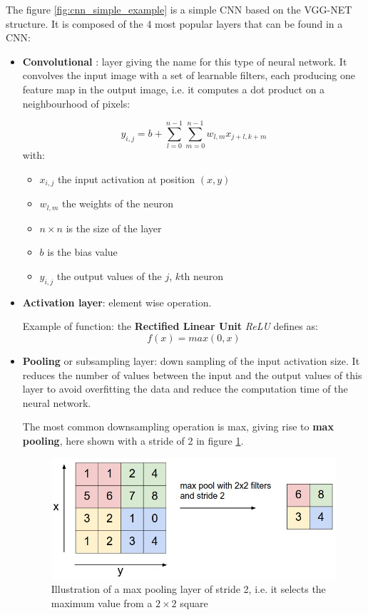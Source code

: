 The figure \ref{fig:cnn_simple_example} is a simple CNN based on the VGG-NET structure. It is composed of the 4 most popular layers that can be found in a CNN:
\begin{itemize}
    \item \textbf{Convolutional} : layer giving the name for this type of neural network. It convolves the input image with a set of learnable filters, each producing one feature map in the output image, i.e. it computes a dot product on a neighbourhood of pixels:
    
    $$ y_{i, j} = b + \sum_{l=0}^{n - 1} \sum_{m=0}^{n - 1}  w_{l,m} x_{j+l, k+m} $$
    with:
    \begin{itemize}
        \item $x_{i,j}$ the input activation at position $(x, y)$
        \item $w_{l, m}$ the weights of the neuron
        \item $n \times n$ is the size of the layer
        \item $b$ is the bias value
        \item $y_{i, j}$ the output values of the $j$, $k$th neuron
    \end{itemize}
    
    \item \textbf{Activation layer}: element wise operation.
    
    Example of function: the \textbf{Rectified Linear Unit} \textit{ReLU} defines as:
    $$ f(x) = max(0, x)$$
   
    \item \textbf{Pooling} or subsampling layer: down sampling of the input activation size. It reduces the number of values between the input and the output values of this layer to avoid overfitting the data and reduce the computation time of the neural network.
    
    The most common downsampling operation is max, giving rise to \textbf{max pooling}, here shown with a stride of 2 in figure \ref{fig:max_pooling}.
    
    \begin{figure}[h]
        \includegraphics[scale=0.5]{img/max_pooling.jpeg}
        \caption[Illustration of a max pooling layer of stride 2]{Illustration of a max pooling layer of stride 2, i.e. it selects the maximum value from a $2 \times 2$ square}
        \label{fig:max_pooling}
    \end{figure}
    

\end{itemize}
